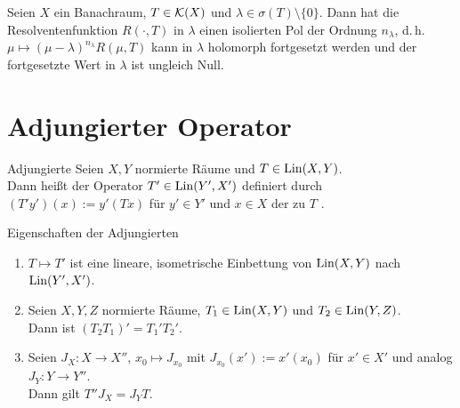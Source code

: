 \linie

\begin{Kor}
    Seien $X$ ein Banachraum, $T \in \mathcal{K}(X)$ und $\lambda \in \sigma(T) \setminus \{0\}$.
    Dann hat die Resolventenfunktion $R(\cdot, T)$ in $\lambda$ einen isolierten Pol
    der Ordnung $n_\lambda$, d.\,h.
    $\mu \mapsto (\mu - \lambda)^{n_\lambda} R(\mu, T)$ kann in $\lambda$ holomorph fortgesetzt
    werden und der fortgesetzte Wert in $\lambda$ ist ungleich Null.
\end{Kor}

\pagebreak

\section{%
    Adjungierter Operator%
}

\begin{Def}{Adjungierte}
    Seien $X, Y$ normierte Räume und $T \in \operatorname{Lin}(X, Y)$.\\
    Dann heißt der Operator $T' \in \operatorname{Lin}(Y', X')$ definiert durch
    $(T'y')(x) := y'(Tx)$ für $y' \in Y'$ und $x \in X$ der zu $T$ .
\end{Def}

\begin{Satz}{Eigenschaften der Adjungierten}
    \begin{enumerate}
        \item
        $T \mapsto T'$ ist eine lineare, isometrische Einbettung
        von $\operatorname{Lin}(X, Y)$ nach $\operatorname{Lin}(Y', X')$.

        \item
        Seien $X, Y, Z$ normierte Räume, $T_1 \in \operatorname{Lin}(X, Y)$ und $T_2 \in \operatorname{Lin}(Y, Z)$.\\
        Dann ist $(T_2 T_1)' = T_1' T_2'$.

        \item
        Seien $J_X\colon X \rightarrow X''$, $x_0 \mapsto J_{x_0}$ mit
        $J_{x_0}(x') := x'(x_0)$ für $x' \in X'$ und analog $J_Y\colon Y \rightarrow Y''$.\\
        Dann gilt $T'' J_X = J_Y T$.
    \end{enumerate}
\end{Satz}

